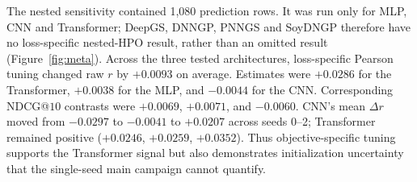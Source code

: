The nested sensitivity contained 1,080 prediction rows. It was run only for
MLP, CNN and Transformer; DeepGS, DNNGP, PNNGS and SoyDNGP therefore have no
loss-specific nested-HPO result, rather than an omitted result (Figure~\ref{fig:meta}).
Across the three tested architectures, loss-specific Pearson tuning changed raw $r$ by $+0.0093$ on
average. Estimates were $+0.0286$ for the Transformer, $+0.0038$ for the MLP,
and $-0.0044$ for the CNN. Corresponding NDCG@$10$ contrasts were $+0.0069$,
$+0.0071$, and $-0.0060$. CNN's mean $\Delta r$ moved from $-0.0297$ to
$-0.0041$ to $+0.0207$ across seeds 0--2; Transformer remained positive
($+0.0246$, $+0.0259$, $+0.0352$). Thus objective-specific tuning supports the
Transformer signal but also demonstrates initialization uncertainty that the
single-seed main campaign cannot quantify.
